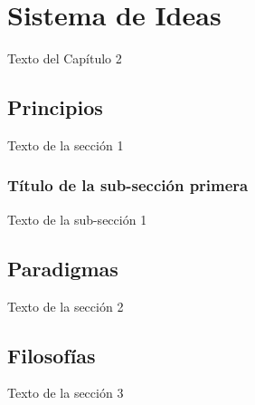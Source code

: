 
\chapter{Sistema de Ideas}

Texto del Capítulo 2

\section{Principios}

Texto de la sección 1


\subsection{Título de la sub-sección primera}

Texto de la sub-sección 1

\section{Paradigmas}

Texto de la sección 2

\section{Filosofías}

Texto de la sección 3

